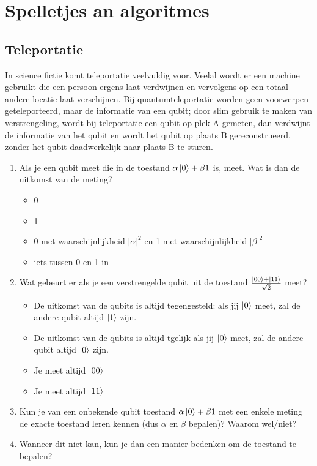 \documentclass[10pt, a4paper]{article}
\begin{document}



\section*{Spelletjes an algoritmes}

\subsection{Teleportatie }

In science fictie komt teleportatie veelvuldig voor. Veelal wordt er een machine gebruikt die een persoon ergens laat verdwijnen en vervolgens op een totaal andere locatie laat verschijnen. Bij quantumteleportatie worden geen voorwerpen geteleporteerd, maar de informatie van een qubit; door slim gebruik te maken van verstrengeling, wordt bij teleportatie een qubit op plek A gemeten, dan verdwijnt de informatie van het qubit en wordt het qubit op plaats B gereconstrueerd, zonder het qubit daadwerkelijk naar plaats B te sturen.

\begin{enumerate}[label=(\alph*)]
\item Als je een qubit meet die in de toestand $\alpha\ket{0}+\beta{1}$ is, meet. Wat is dan de uitkomst van de meting?
\begin{itemize}
\item 0
\item 1
\item 0 met waarschijnlijkheid $|\alpha|^2$ en 1 met waarschijnlijkheid $|\beta|^2$ 
\item iets tussen 0 en 1 in
\end{itemize}

\item Wat gebeurt er als je een verstrengelde qubit uit de toestand  $\frac{\ket{00}+\ket{11}}{\sqrt{2}}$ meet?
\begin{itemize}
\item De uitkomst van de qubits is altijd tegengesteld: als jij $\ket{0}$ meet, zal de andere qubit altijd $\ket{1}$ zijn.
\item De uitkomst van de qubits is altijd tgelijk als jij $\ket{0}$ meet, zal de andere qubit altijd $\ket{0}$ zijn.
\item Je meet altijd $\ket{00}$
\item Je meet altijd $\ket{11}$
\end{itemize}

\item Kun je van een onbekende qubit toestand $\alpha\ket{0}+\beta{1}$ met een enkele meting de exacte toestand leren kennen (dus $\alpha$ en $\beta$ bepalen)? Waarom wel/niet?

\item Wanneer dit niet kan, kun je dan een manier bedenken om de toestand te bepalen?

\end{enumerate}
\end{document}
